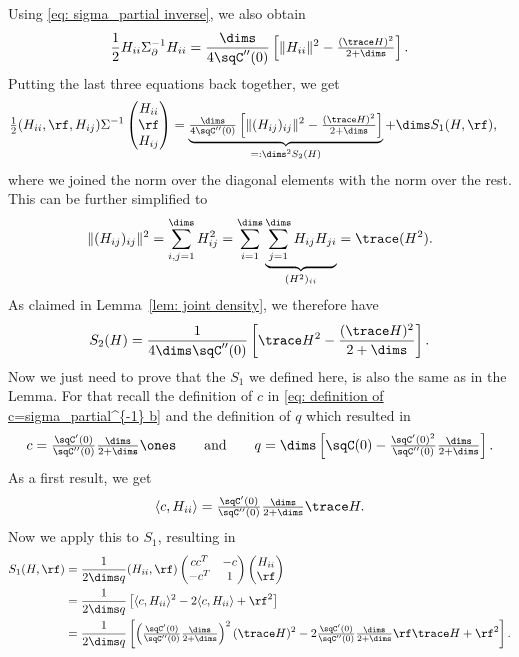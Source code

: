 Using \eqref{eq: sigma_partial inverse}, we also obtain
\[
	\frac12 H_{ii} \Sigma_\partial^{-1} H_{ii}
	= \frac{\dims}{4\sqC''(0)}
	\left[\|H_{ii}\|^2 - \tfrac{(\trace H)^2}{2+\dims}\right].
\]
Putting the last three equations back together, we get
\begin{align*}
		\tfrac12
		( H_{ii},\rf, H_{ij} )\Sigma^{-1}
		\begin{pmatrix}
			H_{ii}\\
			\rf\\
			H_{ij}
		\end{pmatrix}
		&= \underbrace{
			\tfrac{\dims}{4\sqC''(0)}\left[
			\|(H_{ij})_{ij}\|^2
			- \tfrac{(\trace H)^2}{2+\dims}
		\right]
		}_{=: \dims^2 S_2(H)}
		+ \dims S_1(H,\rf),
\end{align*}
where we joined the norm over the diagonal elements with the norm over the rest.
This can be further simplified to
\begin{align*}
	\|(H_{ij})_{ij}\|^2 = \sum_{i,j=1}^\dims H_{ij}^2
	= \sum_{i=1}^\dims \underbrace{\sum_{j=1}^\dims H_{ij}H_{ji}}_{(H^2)_{ii}}
	= \trace(H^2).
\end{align*}
As claimed in Lemma~\ref{lem: joint density}, we therefore have
\[
	S_2(H) = \frac{1}{4 \dims \sqC''(0)} \left[
		\trace H^2 - \frac{(\trace H)^2}{2+\dims}
	\right].
\]
Now we just need to prove that the \(S_1\) we defined here, is also the same as
in the Lemma. For that recall the definition of \(c\) in \eqref{eq: definition of
c=sigma_partial^{-1} b} and the definition of \(q\) which resulted in
\[
	c=\tfrac{\sqC'(0)}{\sqC''(0)}\tfrac{\dims}{2+\dims}\ones
	\qquad \text{and} \qquad
	q=\dims\left[
		\sqC(0) - \tfrac{\sqC'(0)^2}{\sqC''(0)}
		\tfrac{\dims}{2+\dims}
	\right].
\]
As a first result, we get
\[
	\langle c, H_{ii}\rangle = 
	\tfrac{\sqC'(0)}{\sqC''(0)}\tfrac{\dims}{2+\dims}\trace H.
\]
Now we apply this to \(S_1\), resulting in
\begin{align*}
	S_1(H, \rf)
	&= \frac{1}{2\dims q}
	(H_{ii},\rf)
	\begin{pmatrix}
		cc^T & -c \\
		-c^T & 1
	\end{pmatrix}
	\begin{pmatrix}
		H_{ii}\\ \rf
	\end{pmatrix}\\
	&= \frac1{2\dims q}
	\left[\langle c, H_{ii}\rangle^2 - 2\langle c, H_{ii}\rangle + \rf^2\right]
	\\
	&= \frac1{2\dims q}
	\left[
		\left(\tfrac{\sqC'(0)}{\sqC''(0)}\tfrac{\dims}{2+\dims}\right)^2(\trace H)^2
		- 2\tfrac{\sqC'(0)}{\sqC''(0)}\tfrac{\dims}{2+\dims} \rf\trace H
		+ \rf^2
	\right].
\end{align*}
